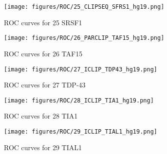 \documentclass[11pt]{article}
\begin{document}
    
    
    \begin{figure}
        \begin{center}
            \texttt{[image: figures/ROC/25\_CLIPSEQ\_SFRS1\_hg19.png]}
            \caption{ROC curves for 25 SRSF1}
            \label{fig:ROC25 SRSF1}
        \end{center}
    \end{figure}

    
    
    \begin{figure}
        \begin{center}
            \texttt{[image: figures/ROC/26\_PARCLIP\_TAF15\_hg19.png]}
            \caption{ROC curves for 26 TAF15}
            \label{fig:ROC26 TAF15}
        \end{center}
    \end{figure}

    
    
    \begin{figure}
        \begin{center}
            \texttt{[image: figures/ROC/27\_ICLIP\_TDP43\_hg19.png]}
            \caption{ROC curves for 27 TDP-43}
            \label{fig:ROC27 TDP-43}
        \end{center}
    \end{figure}

    
    
    \begin{figure}
        \begin{center}
            \texttt{[image: figures/ROC/28\_ICLIP\_TIA1\_hg19.png]}
            \caption{ROC curves for 28 TIA1}
            \label{fig:ROC28 TIA1}
        \end{center}
    \end{figure}

    
    
    \begin{figure}
        \begin{center}
            \texttt{[image: figures/ROC/29\_ICLIP\_TIAL1\_hg19.png]}
            \caption{ROC curves for 29 TIAL1}
            \label{fig:ROC29 TIAL1}
        \end{center}
    \end{figure}
\end{document}

